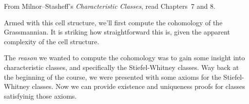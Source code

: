 \documentclass{homework}
\author{Jim Fowler}
\date{Week 6: Characteristic classes}
\begin{document}
\maketitle

From Milnor--Stasheff's \textit{Characteristic Classes}, read
Chapters~7 and 8.

Armed with this cell structure, we'll first compute the cohomology of
the Grassmannian.  It is striking how straightforward this is, given
the apparent complexity of the cell structure.

The \textit{reason} we wanted to compute the cohomology was to gain
some insight into characteristic classes, and specifically the
Stiefel-Whitney classes.  Way back at the beginning of the course, we
were presented with some axioms for the Stiefel-Whitney classes.  Now
we can provide existence and uniqueness proofs for classes satisfyinig
those axioms.
\end{document}
